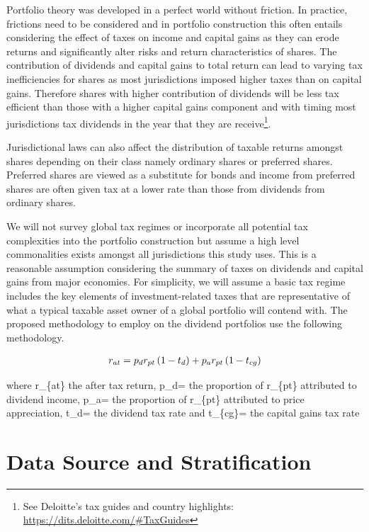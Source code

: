 \documentclass[12pt,preprint, authoryear]{elsarticle}
\numberwithin{equation}{section}
\numberwithin{figure}{section}
\numberwithin{table}{section}
\let\rmarkdownfootnote\footnote%
\def\footnote{\protect\rmarkdownfootnote}
\begin{document}
Portfolio theory was developed in a perfect world without friction. In
practice, frictions need to be considered and in portfolio construction
this often entails considering the effect of taxes on income and capital
gains as they can erode returns and significantly alter risks and return
characteristics of shares. The contribution of dividends and capital
gains to total return can lead to varying tax inefficiencies for shares
as most jurisdictions imposed higher taxes than on capital gains.
Therefore shares with higher contribution of dividends will be less tax
efficient than those with a higher capital gains component and with
timing most jurisdictions tax dividends in the year that they are
receive\footnote{See Deloitte's tax guides and country highlights:
  \url{https://dits.deloitte.com/\#TaxGuides}}.

Jurisdictional laws can also affect the distribution of taxable returns
amongst shares depending on their class namely ordinary shares or
preferred shares. Preferred shares are viewed as a substitute for bonds
and income from preferred shares are often given tax at a lower rate
than those from dividends from ordinary shares.

We will not survey global tax regimes or incorporate all potential tax
complexities into the portfolio construction but assume a high level
commonalities exists amongst all jurisdictions this study uses. This is
a reasonable assumption considering the summary of taxes on dividends
and capital gains from major economies. For simplicity, we will assume a
basic tax regime includes the key elements of investment-related taxes
that are representative of what a typical taxable asset owner of a
global portfolio will contend with. The proposed methodology to employ
on the dividend portfolios use the following methodology.

\begin{align}
r_{a t}=p_d r_{p t}\left(1-t_d\right)+p_a r_{p t}\left(1-t_{c g}\right) \notag
\end{align}

where r\_\{at\} the after tax return, p\_d= the proportion of r\_\{pt\}
attributed to dividend income, p\_a= the proportion of r\_\{pt\}
attributed to price appreciation, t\_d= the dividend tax rate and
t\_\{cg\}= the capital gains tax rate

\newpage

\hypertarget{data-source-and-stratification}{%
\section{Data Source and
Stratification}\label{data-source-and-stratification}}
\end{document}
